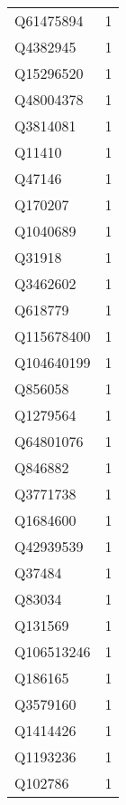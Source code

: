 \begin{tabular}{lr}
   Q61475894 &                             1 \\
    Q4382945 &                             1 \\
   Q15296520 &                             1 \\
   Q48004378 &                             1 \\
    Q3814081 &                             1 \\
      Q11410 &                             1 \\
      Q47146 &                             1 \\
     Q170207 &                             1 \\
    Q1040689 &                             1 \\
      Q31918 &                             1 \\
    Q3462602 &                             1 \\
     Q618779 &                             1 \\
  Q115678400 &                             1 \\
  Q104640199 &                             1 \\
     Q856058 &                             1 \\
    Q1279564 &                             1 \\
   Q64801076 &                             1 \\
     Q846882 &                             1 \\
    Q3771738 &                             1 \\
    Q1684600 &                             1 \\
   Q42939539 &                             1 \\
      Q37484 &                             1 \\
      Q83034 &                             1 \\
     Q131569 &                             1 \\
  Q106513246 &                             1 \\
     Q186165 &                             1 \\
    Q3579160 &                             1 \\
    Q1414426 &                             1 \\
    Q1193236 &                             1 \\
     Q102786 &                             1 \\

\end{tabular}
